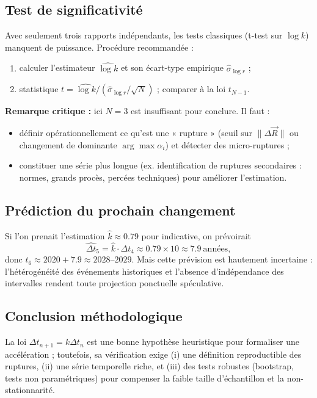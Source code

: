 \documentclass[memoire, 12pt]{report}
\begin{document}
\subsection*{Test de significativité}
Avec seulement trois rapports indépendants, les tests classiques (t-test sur $\log k$) manquent de puissance. Procédure recommandée :
\begin{enumerate}
  \item calculer l'estimateur $\widehat{\log k}$ et son écart-type empirique $\widehat{\sigma}_{\log r}$ ; 
  \item statistique $t = \widehat{\log k}/(\widehat{\sigma}_{\log r}/\sqrt{N})$ ; comparer à la loi $t_{N-1}$.
\end{enumerate}
\vspace{0.2cm}
\noindent \textbf{Remarque critique :} ici $N=3$ est insuffisant pour conclure. Il faut :
\begin{itemize}
  \item définir opérationnellement ce qu'est une « rupture » (seuil sur $\|\Delta\vec R\|$ ou changement de dominante $\arg\max\alpha_i$) et détecter des micro-ruptures ;
  \item constituer une série plus longue (ex. identification de ruptures secondaires : normes, grands procès, percées techniques) pour améliorer l'estimation.
\end{itemize}

\subsection*{Prédiction du prochain changement}
Si l'on prenait l'estimation $\hat{k}\approx0.79$ pour indicative, on prévoirait
\[
\widehat{\Delta t}_5 = \hat{k}\cdot \Delta t_4 \approx 0.79\times 10 \approx 7.9\ \text{années},
\]
donc $t_6 \approx 2020 + 7.9 \approx 2028\text{--}2029$.  
Mais cette prévision est hautement incertaine : l'hétérogénéité des événements historiques et l'absence d'indépendance des intervalles rendent toute projection ponctuelle spéculative.

\subsection*{Conclusion méthodologique}
La loi $\Delta t_{n+1}=k\Delta t_n$ est une bonne hypothèse heuristique pour formaliser une accélération ; toutefois, sa vérification exige (i) une définition reproductible des ruptures, (ii) une série temporelle riche, et (iii) des tests robustes (bootstrap, tests non paramétriques) pour compenser la faible taille d'échantillon et la non-stationnarité.
\end{document}
